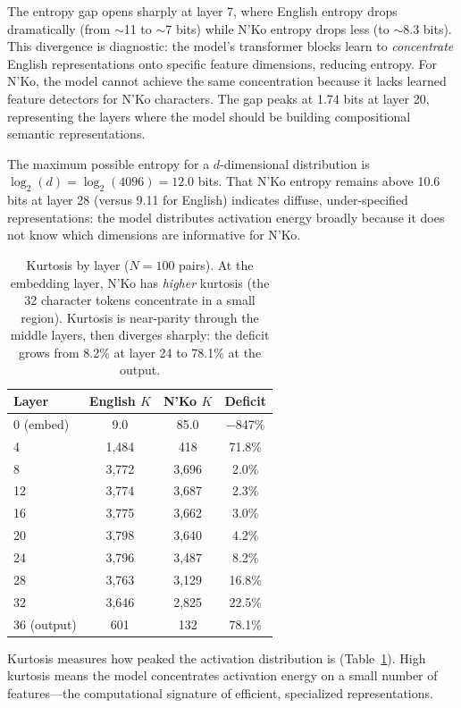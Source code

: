 \documentclass[11pt]{article}
\begin{document}
The entropy gap opens sharply at layer 7, where English entropy drops dramatically (from $\sim$11 to $\sim$7 bits) while N'Ko entropy drops less (to $\sim$8.3 bits).
This divergence is diagnostic: the model's transformer blocks learn to \emph{concentrate} English representations onto specific feature dimensions, reducing entropy.
For N'Ko, the model cannot achieve the same concentration because it lacks learned feature detectors for N'Ko characters.
The gap peaks at 1.74 bits at layer 20, representing the layers where the model should be building compositional semantic representations.

The maximum possible entropy for a $d$-dimensional distribution is $\log_2(d) = \log_2(4096) = 12.0$ bits.
That N'Ko entropy remains above 10.6 bits at layer 28 (versus 9.11 for English) indicates diffuse, under-specified representations: the model distributes activation energy broadly because it does not know which dimensions are informative for N'Ko.

\begin{table}[t]
\centering
\small
\begin{tabular}{lccc}
\toprule
\textbf{Layer} & \textbf{English $K$} & \textbf{N'Ko $K$} & \textbf{Deficit} \\
\midrule
0 (embed) & 9.0 & 85.0 & $-$847\% \\
4 & 1{,}484 & 418 & 71.8\% \\
8 & 3{,}772 & 3{,}696 & 2.0\% \\
12 & 3{,}774 & 3{,}687 & 2.3\% \\
16 & 3{,}775 & 3{,}662 & 3.0\% \\
20 & 3{,}798 & 3{,}640 & 4.2\% \\
24 & 3{,}796 & 3{,}487 & 8.2\% \\
28 & 3{,}763 & 3{,}129 & 16.8\% \\
32 & 3{,}646 & 2{,}825 & 22.5\% \\
36 (output) & 601 & 132 & 78.1\% \\
\bottomrule
\end{tabular}
\caption{Kurtosis by layer ($N=100$ pairs). At the embedding layer, N'Ko has \emph{higher} kurtosis (the 32 character tokens concentrate in a small region). Kurtosis is near-parity through the middle layers, then diverges sharply: the deficit grows from 8.2\% at layer 24 to 78.1\% at the output.}
\label{tab:kurtosis}
\end{table}

Kurtosis measures how peaked the activation distribution is (Table~\ref{tab:kurtosis}).
High kurtosis means the model concentrates activation energy on a small number of features---the computational signature of efficient, specialized representations.
\end{document}
